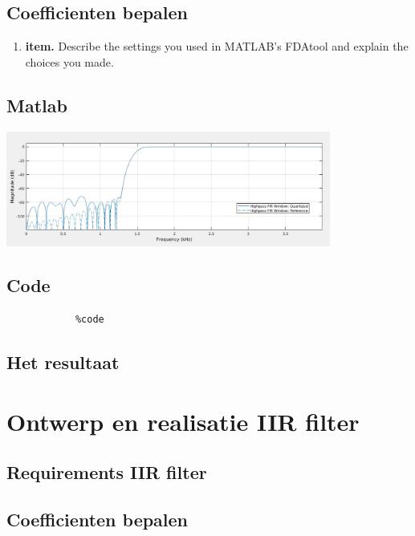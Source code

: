 \documentclass[11pt,a4paper]{article}
\newcommand\litem[1]{\item{\bfseries#1.\space}}
\begin{document}
		\subsection{Coefficienten bepalen}
	
		\begin{enumerate}[label=\emph{\alph*)}]
			\litem{item} Describe the settings you 					used in MATLAB’s FDAtool and explain the 					choices you made.
		\end{enumerate}
	

		\subsection{Matlab}
		
		\includegraphics[width=0.80\textwidth]{firMatlab}\par\vspace{1cm}
		
		\subsection{Code}

		\begin{lstlisting}
			%code
		\end{lstlisting}
		
		\subsection{Het resultaat}

	
	\section{Ontwerp en realisatie IIR filter}
		
		\subsection{Requirements IIR filter}
	
		\subsection{Coefficienten bepalen}
	
\end{document}
